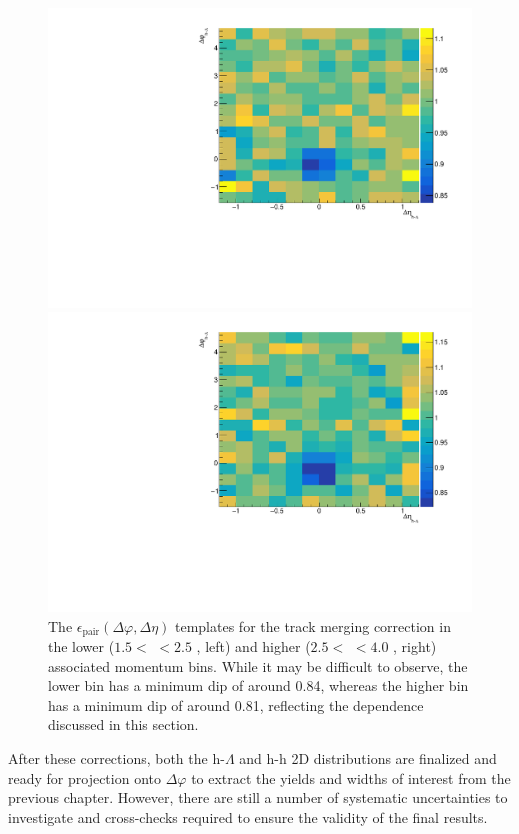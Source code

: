 \begin{figure}[ht]
	\centering
	\begin{minipage}{0.48\textwidth}
		\includegraphics[width=\textwidth]{figures/analysis/twotrack_template_lowpt.pdf}
	\end{minipage}
	\begin{minipage}{0.48\textwidth}
		\includegraphics[width=\textwidth]{figures/analysis/twotrack_template_highpt.pdf}
	\end{minipage}
	\caption{The $\epsilon_{\text{pair}}(\Delta\varphi, \Delta\eta)$ templates for the track merging correction in the lower ($1.5 <$ \pt $< 2.5$ \GeVc, left)  and higher ($2.5 <$ \pt $< 4.0$ \GeVc, right) associated momentum bins. While it may be difficult to observe, the lower \pt bin has a minimum dip of around 0.84, whereas the higher \pt bin has a minimum dip of around 0.81, reflecting the \pt dependence discussed in this section.}
	\label{fig:pair_efficiency_template}
\end{figure}

After these corrections, both the h-$\Lambda$ and h-h 2D distributions are finalized and ready for projection onto $\Delta\varphi$ to extract the yields and widths of interest from the previous chapter. However, there are still a number of systematic uncertainties to investigate and cross-checks required to ensure the validity of the final results.